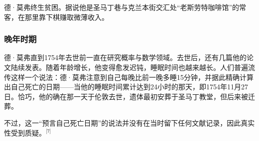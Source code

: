 德·莫弗终生贫困。据说他是圣马丁巷与克兰本街交汇处“老斯劳特咖啡馆”的常客，在那里靠下棋赚取微薄收入。
\subsubsection{晚年时期}
德·莫弗直到1754年去世前一直在研究概率与数学领域。去世后，还有几篇他的论文陆续发表。随着年龄增长，他变得愈发迟钝，睡眠时间也越来越长。人们普遍流传这样一个说法：德·莫弗注意到自己每晚比前一晚多睡15分钟，并据此精确计算出自己死亡的日期——当他的睡眠时间累计达到24小时的那天，即1754年11月27日。恰巧，他的确在那一天于伦敦去世，遗体最初安葬于圣马丁教堂，但后来被迁葬。

不过，这一“预言自己死亡日期”的说法并没有在当时留下任何文献记录，因此真实性受到质疑。\(^\text{[7]}\)
